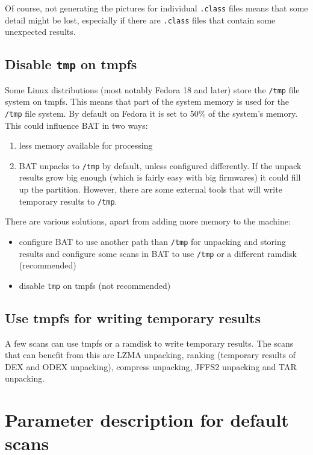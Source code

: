 \documentclass[10pt]{article}
\begin{document}
Of course, not generating the pictures for individual \texttt{.class} files
means that some detail might be lost, especially if there are \texttt{.class}
files that contain some unexpected results.

\subsection{Disable \texttt{tmp} on tmpfs}

Some Linux distributions (most notably Fedora 18 and later) store the
\texttt{/tmp} file system on tmpfs. This means that part of the system memory
is used for the \texttt{/tmp} file system. By default on Fedora it is
set to 50\% of the system's memory. This could influence BAT in two ways:

\begin{enumerate}
\item less memory available for processing
\item BAT unpacks to \texttt{/tmp} by default, unless configured differently. If
the unpack results grow big enough (which is fairly easy with big firmwares) it
could fill up the partition. However, there are some external tools that will
write temporary results to \texttt{/tmp}.
\end{enumerate}

There are various solutions, apart from adding more memory to the machine:

\begin{itemize}
\item configure BAT to use another path than \texttt{/tmp} for unpacking and
storing results and configure some scans in BAT to use \texttt{/tmp} or a
different ramdisk (recommended)
\item disable \texttt{tmp} on tmpfs (not recommended)
\end{itemize}

\subsection{Use tmpfs for writing temporary results}

A few scans can use tmpfs or a ramdisk to write temporary results. The scans
that can benefit from this are LZMA unpacking, ranking (temporary results of
DEX and ODEX unpacking), compress unpacking, JFFS2 unpacking and TAR unpacking.

\section{Parameter description for default scans}
\end{document}
